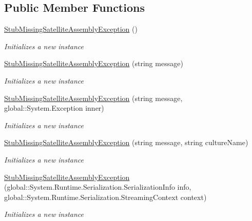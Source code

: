 \subsection*{Public Member Functions}
\begin{DoxyCompactItemize}
\item 
\hyperlink{class_system_1_1_resources_1_1_fakes_1_1_stub_missing_satellite_assembly_exception_aac317e4ed06e0131e552e744d011a4e3}{Stub\-Missing\-Satellite\-Assembly\-Exception} ()
\begin{DoxyCompactList}\small\item\em Initializes a new instance\end{DoxyCompactList}\item 
\hyperlink{class_system_1_1_resources_1_1_fakes_1_1_stub_missing_satellite_assembly_exception_aca93eb062a252bd68a48ca357016efbe}{Stub\-Missing\-Satellite\-Assembly\-Exception} (string message)
\begin{DoxyCompactList}\small\item\em Initializes a new instance\end{DoxyCompactList}\item 
\hyperlink{class_system_1_1_resources_1_1_fakes_1_1_stub_missing_satellite_assembly_exception_a577dc636c8c2684c419d2c91cfb2e635}{Stub\-Missing\-Satellite\-Assembly\-Exception} (string message, global\-::\-System.\-Exception inner)
\begin{DoxyCompactList}\small\item\em Initializes a new instance\end{DoxyCompactList}\item 
\hyperlink{class_system_1_1_resources_1_1_fakes_1_1_stub_missing_satellite_assembly_exception_a1ec31d44abc489e942ae06f1a3f91b51}{Stub\-Missing\-Satellite\-Assembly\-Exception} (string message, string culture\-Name)
\begin{DoxyCompactList}\small\item\em Initializes a new instance\end{DoxyCompactList}\item 
\hyperlink{class_system_1_1_resources_1_1_fakes_1_1_stub_missing_satellite_assembly_exception_a79bdfd960876ebadc7ac4e70949f65bd}{Stub\-Missing\-Satellite\-Assembly\-Exception} (global\-::\-System.\-Runtime.\-Serialization.\-Serialization\-Info info, global\-::\-System.\-Runtime.\-Serialization.\-Streaming\-Context context)
\begin{DoxyCompactList}\small\item\em Initializes a new instance\end{DoxyCompactList}\item 

\end{DoxyCompactItemize}
